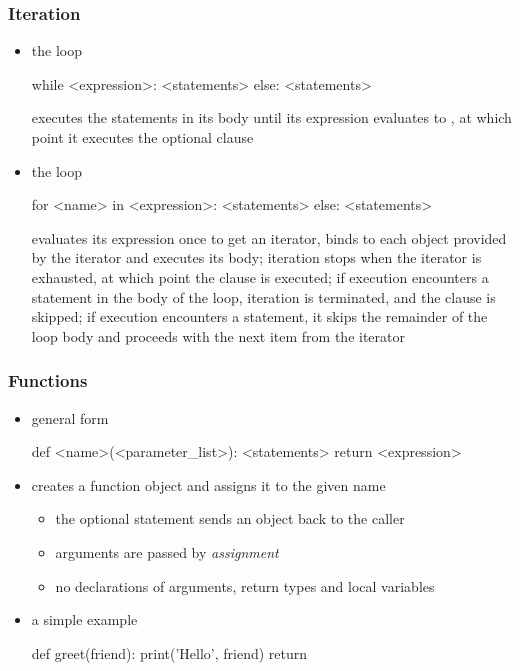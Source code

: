 \begin{frame}[fragile]
%
  \frametitle{Iteration}
%
  \begin{itemize}
%
  \item the  loop
    \begin{ipython}{}
      while <expression>:
          <statements>
      else:
          <statements>
    \end{ipython}
    executes the statements in its body until its expression evaluates to , at
    which point it executes the optional  clause
%
  \item the  loop 
    \begin{ipython}{}
      for <name> in <expression>:
          <statements>
      else:
          <statements>
    \end{ipython}
    evaluates its expression once to get an iterator, binds  to each object
    provided by the iterator and executes its body; iteration stops when the iterator is
    exhausted, at which point the  clause is executed; if execution encounters a
     statement in the body of the loop, iteration is terminated, and the
     clause is skipped; if execution encounters a  statement,
    it skips the remainder of the loop body and proceeds with the next item from the iterator
%
  \end{itemize}
%
\end{frame}

\begin{frame}[fragile]
%
  \frametitle{Functions}
%
  \begin{itemize}
%
  \item general form
    \begin{ipython}{}
      def <name>(<parameter_list>):
          <statements>
          return <expression>
    \end{ipython}
%
  \item creates a function object and assigns it to the given name
    \begin{itemize}
    \item the optional  statement sends an object back to the caller
    \item arguments are passed by \emph{assignment}
    \item no declarations of arguments, return types and local variables
    \end{itemize}
%
  \item a simple example
    \begin{ipython}{}
      def greet(friend):
          print('Hello', friend)
          return
    \end{ipython}
%
  \end{itemize}
%
\end{frame}

